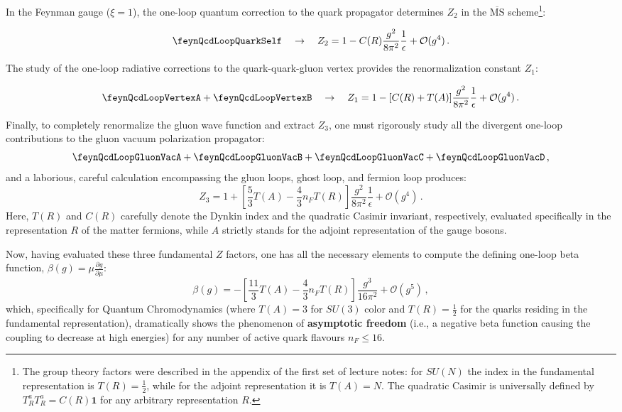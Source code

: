 In the Feynman gauge ($\xi=1$), the one-loop quantum correction to the quark propagator determines $Z_2$ in the $\overline{\text{MS}}$ scheme\footnote{The group theory factors were described in the appendix of the first set of lecture notes: for $SU(N)$ the index in the fundamental representation is $T(R) = \frac{1}{2}$, while for the adjoint representation it is $T(A) = N$. The quadratic Casimir is universally defined by $T^a_R T^a_R = C(R)\mathbf{1}$ for any arbitrary representation $R$.}:

\begin{equation} \label{eq:z2_factor}
    \feynQcdLoopQuarkSelf \quad \rightarrow \quad Z_2 = 1 - C(R)\frac{g^2}{8\pi^2}\frac{1}{\epsilon} + \mathcal{O}(g^4) \, .
\end{equation}

The study of the one-loop radiative corrections to the quark-quark-gluon vertex provides the renormalization constant $Z_1$:

\begin{equation} \label{eq:z1_factor}
    \feynQcdLoopVertexA + \feynQcdLoopVertexB \quad \rightarrow \quad Z_1 = 1 - [C(R) + T(A)]\frac{g^2}{8\pi^2}\frac{1}{\epsilon} + \mathcal{O}(g^4) \, .
\end{equation}

Finally, to completely renormalize the gluon wave function and extract $Z_3$, one must rigorously study all the divergent one-loop contributions to the gluon vacuum polarization propagator:
\[
    \feynQcdLoopGluonVacA + \feynQcdLoopGluonVacB + \feynQcdLoopGluonVacC + \feynQcdLoopGluonVacD \, ,
\]
and a laborious, careful calculation encompassing the gluon loops, ghost loop, and fermion loop produces:
\begin{equation} \label{eq:z3_factor}
    Z_3 = 1 + \left[ \frac{5}{3}T(A) - \frac{4}{3}n_F T(R) \right] \frac{g^2}{8\pi^2}\frac{1}{\epsilon} + \mathcal{O}(g^4) \, .
\end{equation}
Here, $T(R)$ and $C(R)$ carefully denote the Dynkin index and the quadratic Casimir invariant, respectively, evaluated specifically in the representation $R$ of the matter fermions, while $A$ strictly stands for the adjoint representation of the gauge bosons.

Now, having evaluated these three fundamental $Z$ factors, one has all the necessary elements to compute the defining one-loop beta function, $\beta(g) = \mu \frac{\partial g}{\partial \mu}$:
\begin{equation} \label{eq:beta_function}
    \beta(g) = - \left[ \frac{11}{3}T(A) - \frac{4}{3}n_F T(R) \right] \frac{g^3}{16\pi^2} + \mathcal{O}(g^5) \, ,
\end{equation}
which, specifically for Quantum Chromodynamics (where $T(A) = 3$ for $SU(3)$ color and $T(R) = \frac{1}{2}$ for the quarks residing in the fundamental representation), dramatically shows the phenomenon of \textbf{asymptotic freedom} (i.e., a negative beta function causing the coupling to decrease at high energies) for any number of active quark flavours $n_F \le 16$.

